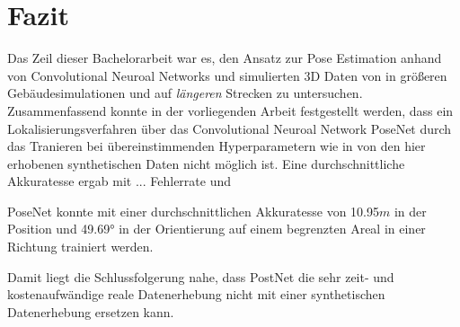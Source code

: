 
\section{Fazit}
\label{sec:kapitel_6}
Das Zeil dieser Bachelorarbeit war es, den Ansatz zur Pose Estimation anhand von Convolutional Neuroal Networks und simulierten 3D Daten von \citet{acharyaBIMPoseNetIndoorCamera2019} in größeren Gebäudesimulationen und auf \textit{längeren} Strecken zu untersuchen.
Zusammenfassend konnte in der vorliegenden Arbeit festgestellt werden, dass ein Lokalisierungsverfahren über das Convolutional Neuroal Network PoseNet durch das Tranieren bei übereinstimmenden Hyperparametern wie in \cite{acharyaBIMPoseNetIndoorCamera2019} von den hier erhobenen synthetischen Daten nicht möglich ist. Eine durchschnittliche Akkuratesse ergab mit ... Fehlerrate und 

PoseNet konnte mit einer durchschnittlichen Akkuratesse von 10.95$m$ in der Position und 49.69° in der Orientierung auf einem begrenzten Areal in einer Richtung trainiert werden.

Damit liegt die Schlussfolgerung nahe, dass PostNet die sehr zeit- und kostenaufwändige reale Datenerhebung nicht mit einer synthetischen Datenerhebung ersetzen kann.
